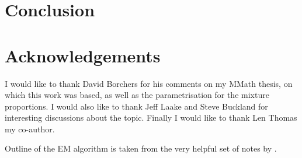 \section{Conclusion}


\section{Acknowledgements}

I would like to thank David Borchers for his comments on my MMath thesis, on which this work was based, as well as the parametrisation for the mixture proportions. I would also like to thank Jeff Laake and Steve Buckland for interesting discussions about the topic. Finally I would like to thank Len Thomas my co-author.

Outline of the EM algorithm is taken from the very helpful set of notes by \cite{piater}.

